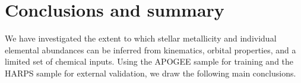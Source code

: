 \documentclass{aa}
\begin{document}
%
%
%
%
%


\section{Conclusions and summary} \label{conclusion}

We have investigated the extent to which stellar metallicity and individual elemental abundances can be inferred from kinematics, orbital properties, and a limited set of chemical inputs. Using the APOGEE sample for training and the HARPS sample for external validation, we draw the following main conclusions.
\end{document}
